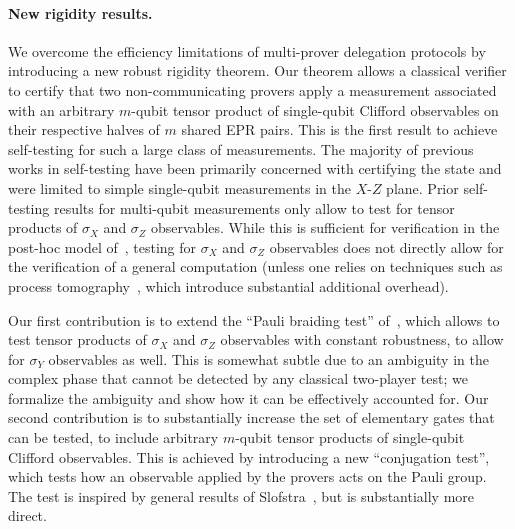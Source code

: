\documentclass[11pt]{article}
\theoremstyle{remark}
\theoremstyle{definition}
\newcommand{\agnote}[1]{\textcolor{cyan}{\small {\textbf{(Alex:} #1 \textbf{) }}}}
\begin{document}

\paragraph{New rigidity results.} We overcome the efficiency limitations of
multi-prover delegation protocols by introducing a new robust rigidity theorem. Our theorem allows a classical verifier to certify that two non-communicating provers apply a measurement associated with an arbitrary $m$-qubit tensor product of single-qubit Clifford observables on their respective halves of $m$ shared EPR pairs.
This is the first result to achieve self-testing for such a large class of
measurements. The majority of previous works in self-testing have been primarily
concerned with certifying the state and were limited to simple single-qubit
measurements in the $X$-$Z$ plane. Prior self-testing results for multi-qubit
measurements only allow to test for tensor products of $\sigma_X$ and $\sigma_Z$
observables. While this is sufficient for verification in the post-hoc model
of~\cite{hajdusek2015posthoc}, testing for $\sigma_X$ and $\sigma_Z$ observables
does not directly allow for the verification of a general computation (unless
one relies on techniques such as process
tomography~\cite{reichardt2012classical}, which introduce substantial additional
overhead).  

Our first contribution is to extend the ``Pauli braiding test'' of~\cite{natarajan2016robust}, which allows to test tensor products of $\sigma_X$ and $\sigma_Z$ observables with constant robustness, to allow for $\sigma_Y$ observables as well. This is somewhat subtle due to an ambiguity in the complex phase that cannot be detected by any classical two-player test; we formalize the ambiguity and show how it can be effectively accounted for. Our second contribution is to substantially increase the set of elementary gates that can be tested, to include arbitrary $m$-qubit tensor products of single-qubit Clifford observables. This is achieved by introducing a new ``conjugation test'', which tests how an observable applied by the provers acts on the Pauli group. The test is inspired by general results of Slofstra~\cite{slofstra2016tsirelson}, but is substantially more direct. 
\end{document}
